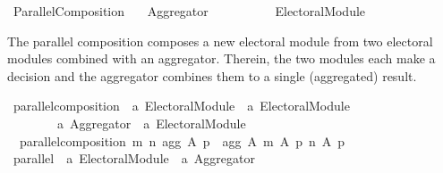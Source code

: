 %
\begin{isabellebody}%
%
%
\isadelimdocument
\isanewline
%
\endisadelimdocument
%
\isatagdocument
\isanewline
\isanewline
%
\isamarkuptrue%
%
\endisatagdocument
{\isafolddocument}%
%
\isadelimdocument
%
\endisadelimdocument
%
\isadelimtheory
%
\endisadelimtheory
%
\isatagtheory
{}\isamarkupfalse%
\ Parallel{\isacharunderscore}{\kern0pt}Composition\isanewline
\ \ \ {\isachardoublequoteopen}{\isachardot}{\kern0pt}{\isachardot}{\kern0pt}{\isacharslash}{\kern0pt}Aggregator{\isachardoublequoteclose}\isanewline
\ \ \ \ \ \ \ \ \ \ {\isachardoublequoteopen}{\isachardot}{\kern0pt}{\isachardot}{\kern0pt}{\isacharslash}{\kern0pt}Electoral{\isacharunderscore}{\kern0pt}Module{\isachardoublequoteclose}\isanewline
{}%
\endisatagtheory
{\isafoldtheory}%
%
\isadelimtheory
%
\endisadelimtheory
%
\begin{isamarkuptext}%
The parallel composition composes a new electoral module from
two electoral modules combined with an aggregator.
Therein, the two modules each make a decision and the aggregator combines
them to a single (aggregated) result.%
\end{isamarkuptext}\isamarkuptrue%
%
\isadelimdocument
%
\endisadelimdocument
%
\isatagdocument
%
\isamarkuptrue%
%
\endisatagdocument
{\isafolddocument}%
%
\isadelimdocument
%
\endisadelimdocument
{}\isamarkupfalse%
\ parallel{\isacharunderscore}{\kern0pt}composition\ {\isacharcolon}{\kern0pt}{\isacharcolon}{\kern0pt}\ {\isachardoublequoteopen}{\isacharprime}{\kern0pt}a\ Electoral{\isacharunderscore}{\kern0pt}Module\ {\isasymRightarrow}\ {\isacharprime}{\kern0pt}a\ Electoral{\isacharunderscore}{\kern0pt}Module\ {\isasymRightarrow}\isanewline
\ \ \ \ \ \ \ \ {\isacharprime}{\kern0pt}a\ Aggregator\ {\isasymRightarrow}\ {\isacharprime}{\kern0pt}a\ Electoral{\isacharunderscore}{\kern0pt}Module{\isachardoublequoteclose}\ \isanewline
\ \ {\isachardoublequoteopen}parallel{\isacharunderscore}{\kern0pt}composition\ m\ n\ agg\ A\ p\ {\isacharequal}{\kern0pt}\ agg\ A\ {\isacharparenleft}{\kern0pt}m\ A\ p{\isacharparenright}{\kern0pt}\ {\isacharparenleft}{\kern0pt}n\ A\ p{\isacharparenright}{\kern0pt}{\isachardoublequoteclose}\isanewline
\isanewline
{}\isamarkupfalse%
\ parallel\ {\isacharcolon}{\kern0pt}{\isacharcolon}{\kern0pt}\ {\isachardoublequoteopen}{\isacharprime}{\kern0pt}a\ Electoral{\isacharunderscore}{\kern0pt}Module\ {\isasymRightarrow}\ {\isacharprime}{\kern0pt}a\ Aggregator\ {\isasymRightarrow}\isanewline

\end{isabellebody}

